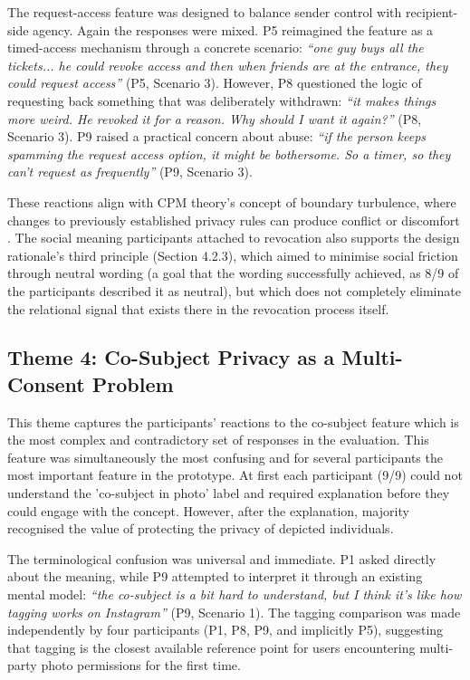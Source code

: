 The request-access feature was designed to balance sender control with recipient-side agency. Again the responses were mixed. P5 reimagined the feature as a timed-access mechanism through a concrete scenario: \textit{``one guy buys all the tickets... he could revoke access and then when friends are at the entrance, they could request access''} (P5, Scenario 3). However, P8 questioned the logic of requesting back something that was deliberately withdrawn: \textit{``it makes things more weird. He revoked it for a reason. Why should I want it again?''} (P8, Scenario 3). P9 raised a practical concern about abuse: \textit{``if the person keeps spamming the request access option, it might be bothersome. So a timer, so they can't request as frequently''} (P9, Scenario 3).

These reactions align with CPM theory's concept of boundary turbulence, where changes to previously established privacy rules can produce conflict or discomfort \cite{petronio_cpm_2020}. The social meaning participants attached to revocation also supports the design rationale's third principle (Section 4.2.3), which aimed to minimise social friction through neutral wording (a goal that the wording successfully achieved, as 8/9 of the participants described it as neutral), but which does not completely eliminate the relational signal that exists there in the revocation process itself.

\subsection{Theme 4: Co-Subject Privacy as a Multi-Consent Problem}
This theme captures the participants' reactions to the co-subject feature which is the most complex and contradictory set of responses in the evaluation. This feature was simultaneously the most confusing and for several participants the most important feature in the prototype. At first each participant (9/9) could not understand the 'co-subject in photo' label and required explanation before they could engage with the concept. However, after the explanation, majority recognised the value of protecting the privacy of depicted individuals.

The terminological confusion was universal and immediate. P1 asked directly about the meaning, while P9 attempted to interpret it through an existing mental model: \textit{``the co-subject is a bit hard to understand, but I think it's like how tagging works on Instagram''} (P9, Scenario 1). The tagging comparison was made independently by four participants (P1, P8, P9, and implicitly P5), suggesting that tagging is the closest available reference point for users encountering multi-party photo permissions for the first time.

